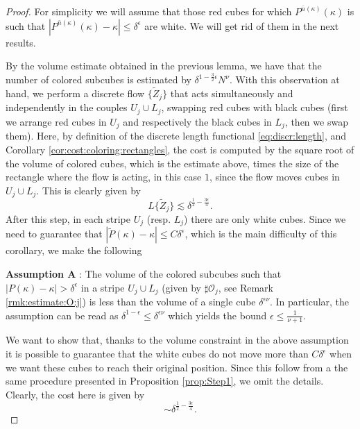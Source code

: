 \documentclass[12 pt]{article}
\theoremstyle{definition} \newtheorem{definition}{Definition}[section]
\theoremstyle{definition} \newtheorem{remark}[definition]{Remark}
\theoremstyle{plain} \newtheorem{lemma}[definition]{Lemma}
\theoremstyle{plain} \newtheorem{proposition}[definition]{Proposition}
\theoremstyle{plain} \newtheorem{theorem}[definition]{Theorem}
\theoremstyle{plain} \newtheorem{corollary}[definition]{Corollary}
\theoremstyle{definition} \newtheorem{example}[definition]{Example}
\theoremstyle{definition} \newtheorem{assumption}[definition]{Assumption}
\theoremstyle{definition} \newtheorem{conjecture}[definition]{Conjecture}
\newcommand{\1}{\mathbbm 1}
\numberwithin{equation}{section}
\begin{document}
\begin{proof}
     For simplicity we will assume that those red cubes for which $P^{\bar{n}(\kappa)}(\kappa)$ is such that $|P^{\bar{n}(\kappa)}(\kappa)-\kappa|\leq\delta^\epsilon$ are white. We will get rid of them in the next results.

     \medskip 
     
     By the volume estimate obtained in the previous lemma, we have that the number of colored subcubes is estimated by $\delta^{1-\frac{3}{2}\epsilon}N^{\nu}$.
     With this observation at hand, we perform a discrete flow $\lbrace \tilde Z_j\rbrace$ that acts simultaneously and independently in the couples $U_j\cup L_j$, swapping red cubes with black cubes (first we arrange red cubes in $U_j$ and respectively the black cubes in $L_j$, then we swap them).
       Here, by definition of the discrete length functional \eqref{eq:discr:length}, and Corollary \ref{cor:cost:coloring:rectangles}, the cost is computed by the square root of the volume of colored cubes, which is the estimate above, times the size of the rectangle where the flow is acting, in this case $1$, since the flow moves cubes in $U_j\cup L_j$. This is clearly given by
       \begin{equation*}
            L\lbrace\tilde Z_j\rbrace\lesssim \delta^{\frac{1}{2}-\frac{3\epsilon}{4}}.
       \end{equation*}
       After this step, in each stripe $U_j$ (resp. $L_j$) there are only white cubes.
      Since we need to guarantee that $|\tilde P(\kappa)-\kappa|\leq C\delta^\epsilon$, which is the main difficulty of this corollary, we make the following

      \medskip
      \textbf{Assumption A} :  The volume of the colored subcubes such that $|P(\kappa)-\kappa|>\delta^\epsilon$ in a stripe $U_j\cup L_j$ (given by $\sharp\mathcal{O}_j$, see Remark \ref{rmk:estimate:O:j}) is less than the volume of a single cube $\delta^{\epsilon\nu}$. In particular, the assumption can be read as $\delta^{1-\epsilon}\leq\delta^{\epsilon\nu}$ which yields the bound $\epsilon\leq\frac{1}{\nu+1}$. 


      We want to show that, thanks to the volume constraint in the above assumption it is possible to guarantee that the white cubes do not move more than $C\delta^\epsilon$ when we want these cubes to reach their original position. 
      Since this follow from a the same procedure presented in Proposition \ref{prop:Step1}, we omit the details. 
      Clearly, the cost here is given by 
      \begin{equation*}
          \sim \delta^{\frac{1}{2}-\frac{3\epsilon}{4}}.
      \end{equation*}




\end{proof}
\end{document}
